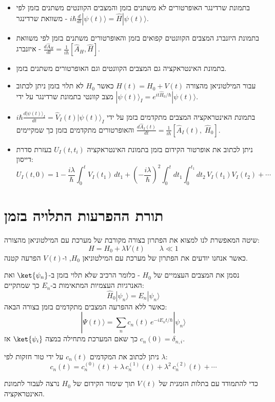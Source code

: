 \documentclass{tstextbook}
\begin{document}
\begin{summary}
  \begin{itemize}
    \item בתמונת שרדינגר האופרטורים לא משתנים בזמן והמצבים הקוונטים משתנים בזמן לפי משוואת שרדינגר - \(i\hbar{\frac{d}{d t}}|\psi(t)\rangle={\hat{H}}|\psi(t)\rangle\).
    \item בתמונת היזנברג המצבים הקוונטים קפואים בזמן והאופרטורים משתנים בזמן לפי משוואת איזנברג - \(\frac{d\hat{A}_{H}}{d t}=\frac{1}{i\hbar}\left[\hat{A}_{H},\hat{H}\right]\).
    \item בתמונת האינטראקציה גם המצבים הקוונטים וגם האופרטורים משתנים בזמן.
    \item עבור המילטוניאן מהצורה \(H(t)=H_{0}+V(t)\) כאשר \(H_{0}\) לא תלוי בזמן ניתן לכתוב מצב קוונטי בתמונת שרדינגר על ידי \(|\psi(t)\rangle_{I}=e^{i t\hat{H}_{0}/\hbar}|\psi(t)\rangle\).
    \item בתמונת האינטראקציה המצבים מתקדמים בזמן על ידי \(i\hbar\frac{d|\psi(t)\rangle_{I}}{d t}=\hat{V}_{I}(t)|\psi(t)\rangle_{I}\) והאופרטורים מתקדמים בזמן כך שמקיימים \(\frac{d\hat{A}_{I}(t)}{d t}=\frac{1}{i\hbar}\left[\hat{A}_{I}(t),\;\hat{H}_{0}\right]\).
    \item ניתן לכתוב את אופרטור הקידום בזמן בתמונת האינטראקציה \(U_{I}(t,t_{i})\) בעזרת סדרת דייסון:
$$U_{I}(t,0)=1-\frac{i\lambda}{\hbar}\int_{0}^{t}V_{I}(t_{1})\,d t_{1}+\left(-\frac{i\lambda}{\hbar}\right)^{2}\int_{0}^{t}d t_{1}\int_{0}^{t_{1}}d t_{2}\,V_{I}(t_{1})V_{I}(t_{2})+\cdots$$
  \end{itemize}
\end{summary}
\section{תורת ההפרעות התלויה בזמן}

\begin{definition}
שיטה המאפשרת לנו למצוא את הפתרון בצורה מקורבת של מערכת עם המילטוניאן מהצורה:
$$H= H_{0}+ \lambda V(t)\qquad \lambda\ll 1$$
כאשר אנחנו יודעים את הפתרון של מערכת עם המילטוניאן \(H_{0}\), ו-\(V(t)\) הפרעה קטנה.

\end{definition}
\begin{symbolize}
נסמן את המצבים העצמיים של \(H_{0}\) - כלומר הרכיב שלא תלוי בזמן ב-\(\ket{\psi_{n}}\) ואת האנרגיות העצמיות המתאימות ב-\(E_{n}\) כך שמתקיים:
$$\hat{H}_{0}|\psi_{n}\rangle=E_{n}|\psi_{n}\rangle$$
כאשר ללא ההפרעה המצבים מתקדמים בזמן בצורה הבאה:
$$|\Psi(t)\rangle=\sum_{n}c_{n}(t)\,e^{-i E_{n}t/\hbar}|\psi_{n}\rangle$$
כך שאם המערכת מתחילה במצה \(\ket{\psi_{i}}\) אז \(c_{n}(0)=\delta_{n,i}\).

\end{symbolize}
\begin{symbolize}
ניתן לכתוב את המקדמים \(c_{n}(t)\) על ידי טור חזקות לפי \(\lambda\):
$$c_{n}(t)=c_{n}^{(0)}(t)+\lambda\,c_{n}^{(1)}(t)+\lambda^{2}\,c_{n}^{(2)}(t)+\cdots$$

\end{symbolize}
כדי להתמודד עם בתלות הזמנית של \(V(t)\) תוך שימור הקידום של \(H_{0}\) נרצה לעבור לתמונת האינטראקציה.
\end{document}
